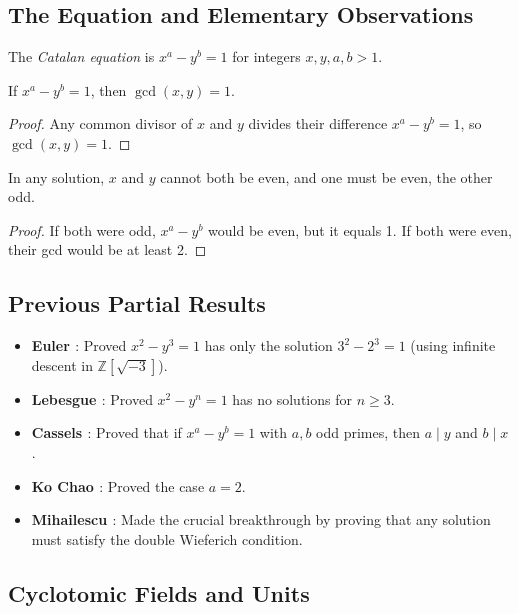\subsection{The Equation and Elementary Observations}

\begin{definition}
The \emph{Catalan equation} is $x^a - y^b = 1$ for integers $x, y, a, b > 1$.
\end{definition}

\begin{lemma}
If $x^a - y^b = 1$, then $\gcd(x, y) = 1$.
\end{lemma}
\begin{proof}
Any common divisor of $x$ and $y$ divides their difference $x^a - y^b = 1$, so $\gcd(x, y) = 1$.
\end{proof}

\begin{lemma}
In any solution, $x$ and $y$ cannot both be even, and one must be even, the other odd.
\end{lemma}
\begin{proof}
If both were odd, $x^a - y^b$ would be even, but it equals 1. If both were even, their gcd would be at least 2.
\end{proof}

\subsection{Previous Partial Results}

\begin{itemize}
\item \textbf{Euler \cite{euler1783}}: Proved $x^2 - y^3 = 1$ has only the solution $3^2 - 2^3 = 1$ (using infinite descent in $\mathbb{Z}[\sqrt{-3}]$).
\item \textbf{Lebesgue \cite{lebesgue1850}}: Proved $x^2 - y^n = 1$ has no solutions for $n \geq 3$.
\item \textbf{Cassels \cite{cassels1960}}: Proved that if $x^a - y^b = 1$ with $a, b$ odd primes, then $a \mid y$ and $b \mid x$.
\item \textbf{Ko Chao \cite{kochao1965}}: Proved the case $a = 2$.
\item \textbf{Mihailescu \cite{mihailescu2004}}: Made the crucial breakthrough by proving that any solution must satisfy the double Wieferich condition.
\end{itemize}

\subsection{Cyclotomic Fields and Units}

